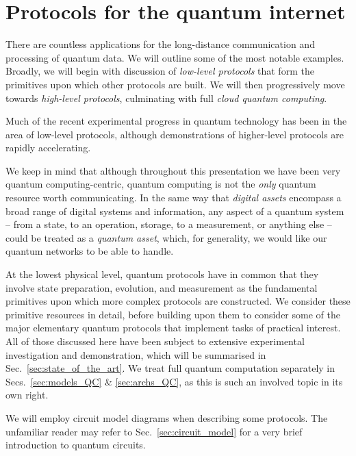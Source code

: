 %
%

\section{Protocols for the quantum internet} \label{sec:protocols_quant_int} 

There are countless applications for the long-distance communication and processing of quantum data. We will outline some of the most notable examples. Broadly, we will begin with discussion of \textit{low-level protocols} that form the primitives upon which other protocols are built. We will then progressively move towards \textit{high-level protocols}, culminating with full \textit{cloud quantum computing}.

Much of the recent experimental progress in quantum technology has been in the area of low-level protocols, although demonstrations of higher-level protocols are rapidly accelerating.

We keep in mind that although throughout this presentation we have been very quantum computing-centric, quantum computing is not the \textit{only} quantum resource worth communicating. In the same way that \textit{digital assets} encompass a broad range of digital systems and information, any aspect of a quantum system -- from a state, to an operation, storage, to a measurement, or anything else -- could be treated as a \textit{quantum asset}, which, for generality, we would like our quantum networks to be able to handle.

At the lowest physical level, quantum protocols have in common that they involve state preparation, evolution, and measurement as the fundamental primitives upon which more complex protocols are constructed. We consider these primitive resources in detail, before building upon them to consider some of the major elementary quantum protocols that implement tasks of practical interest. All of those discussed here have been subject to extensive experimental investigation and demonstration, which will be summarised in Sec.~\ref{sec:state_of_the_art}. We treat full quantum computation separately in Secs.~\ref{sec:models_QC} \& \ref{sec:archs_QC}, as this is such an involved topic in its own right.

We will employ circuit model diagrams when describing some protocols. The unfamiliar reader may refer to Sec.~\ref{sec:circuit_model} for a very brief introduction to quantum circuits.

